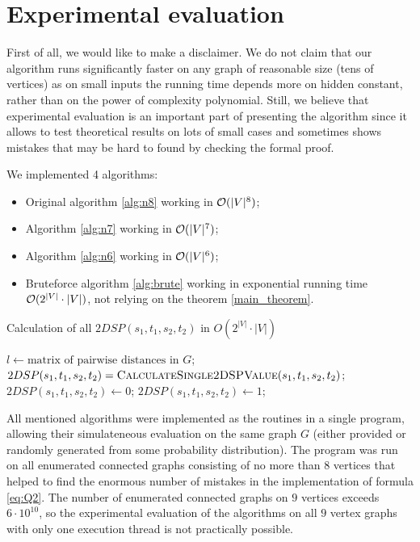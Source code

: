 \section{Experimental evaluation}

First of all, we would like to make a disclaimer. We do not claim that our algorithm runs significantly faster on any graph of reasonable size (tens of vertices) as on small inputs the running time depends more on hidden constant, rather than on the power of complexity polynomial. Still, we believe that experimental evaluation is an important part of presenting the algorithm since it allows to test theoretical results on lots of small cases and sometimes shows mistakes that may be hard to found by checking the formal proof. 

We implemented 4 algorithms:

\begin{itemize}
\item Original algorithm \ref{alg:n8} working in $\mathcal{O}(|V|^8)$;
\item Algorithm \ref{alg:n7} working in $\mathcal{O}(|V|^7)$;
\item Algorithm \ref{alg:n6} working in $\mathcal{O}(|V|^6)$;
\item Bruteforce algorithm \ref{alg:brute} working in exponential running time $\mathcal{O}(2^{|V|} \cdot |V|)$, not relying on the theorem \ref{main_theorem}.
\end{itemize}

\begin{algorithm}
\caption{Calculation of all $2DSP(s_1, t_1, s_2, t_2)$ in $O(2^{|V|} \cdot |V|)$} \label{alg:brute}
\begin{algorithmic}[1]
\State $l \gets \text{matrix of pairwise distances in }G$;
    \State $2DSP(s_1, t_1, s_2, t_2) = \textsc{CalculateSingle2DSPValue}(s_1, t_1, s_2, t_2)$;
\EndFor
\EndProcedure
\Statex
{}
\State $2DSP(s_1, t_1, s_2, t_2) \gets 0$;
        \State $2DSP(s_1, t_1, s_2, t_2) \gets 1$;
    \EndIf
\EndFor
\EndProcedure
\end{algorithmic}
\end{algorithm}

All mentioned algorithms were implemented as the routines in a single program, allowing their simulateneous evaluation on the same graph $G$ (either provided or randomly generated from some probability distribution). The program was run on all enumerated connected graphs consisting of no more than $8$ vertices that helped to find the enormous number of mistakes in the implementation of formula \eqref{eq:Q2}. The number of enumerated connected graphs on $9$ vertices exceeds $6 \cdot 10^{10}$, so the experimental evaluation of the algorithms on all $9$ vertex graphs with only one execution thread is not practically possible. 

